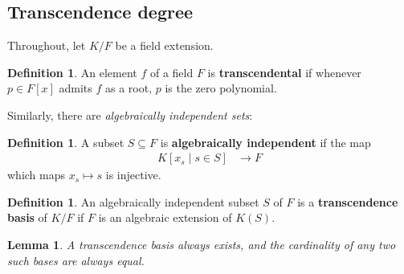 \documentclass[12pt]{article}
\theoremstyle{plain}
\newtheorem{lemma}[thm]{Lemma}
\theoremstyle{definition}
\newtheorem{defn}[thm]{Definition} %
\begin{document}
	\subsection{Transcendence degree}
	\label{transcendence}
	Throughout, let $K/F$ be a field extension.
	\begin{defn}
		An element $f$ of a field $F$ is \textbf{transcendental} if whenever $p \in F[x]$ admits $f$ as a root, $p$ is the zero polynomial.
	\end{defn}
	Similarly, there are \emph{algebraically independent sets}:
	\begin{defn}\label{def:algebraic_independence}
		A subset $S \subseteq F$ is \textbf{algebraically independent} if the map
		\begin{align*}
			K[x_s\mid s\in S] &\to F
		\end{align*}
		which maps $x_s \mapsto s$ is injective.
	\end{defn}
	\begin{defn}
		An algebraically independent subset $S$ of $F$ is a \textbf{transcendence basis} of $K/F$ if $F$ is an algebraic extension of $K(S)$.
	\end{defn}
	\begin{lemma}
		A transcendence basis always exists, and the cardinality of any two such bases are always equal.
	\end{lemma}
\end{document}
